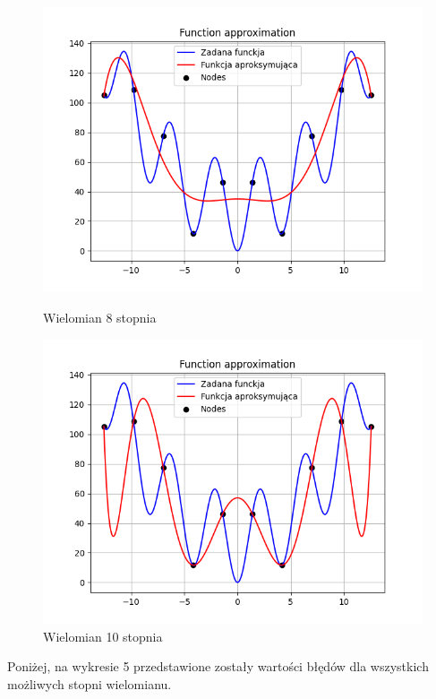 \documentclass{article}
\begin{document}
\begin{figure}[H]
\begin{minipage}[b]{0.49\textwidth}
    \begin{minipage}[b]{\textwidth}
      \includegraphics[width=\textwidth]{img04.png}
      \caption{Wielomian 8 stopnia}
    \end{minipage}
    \vspace*{\fill}
    \begin{minipage}[b]{\textwidth}
      \includegraphics[width=\textwidth]{img05.png}
      \caption{Wielomian 10 stopnia}
    \end{minipage}
  \end{minipage}
\end{figure}

Poniżej, na wykresie 5 przedstawione zostały wartości błędów dla wszystkich możliwych stopni wielomianu.
\end{document}
